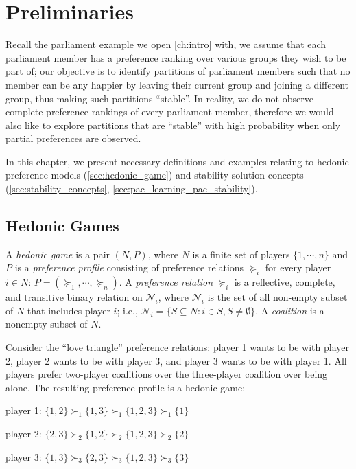 
\chapter{Preliminaries}
\label{ch:preliminaries}

Recall the parliament example we open \autoref{ch:intro} with, we assume that each
parliament member has a preference ranking over various groups they wish to be
part of; our objective is to identify partitions of parliament members such that
no member can be any happier by leaving their current group and joining a
different group, thus making such partitions ``stable''.
In reality, we do not observe complete preference rankings of every parliament
member, therefore we would also like to explore partitions that are ``stable''
with high probability when only partial preferences are observed.

In this chapter, we present necessary definitions and examples relating to
hedonic preference models (\autoref{sec:hedonic_game}) and
stability solution concepts (\autoref{sec:stability_concepts},
\autoref{sec:pac_learning_pac_stability}).

\section{Hedonic Games}
\label{sec:hedonic_game}

A \textit{hedonic game} is a pair $(N, P)$, where $N$ is a finite set of players
$\{1, \cdots, n\}$ and $P$ is a \textit{preference profile} consisting of
preference relations $\succeq_i$ for every player $i \in N$:
$P = (\succeq_1, \cdots, \succeq_n)$.
A \textit{preference relation} $\succeq_i$ is a reflective, complete, and
transitive binary relation on $\mathcal{N}_i$, where $\mathcal{N}_i$ is the set
of all non-empty subset of $N$ that includes player $i$;
i.e., $\mathcal{N}_i = \{S \subseteq N: i \in S, S \neq \emptyset \}$.
A \textit{coalition} is a nonempty subset of $N$.

\begin{example}
\label{example:not_top_responsive_pref}
  Consider the ``love triangle'' preference relations: player 1 wants
  to be with player 2, player 2 wants to be with player 3, and player 3 wants to
  be with player 1. All players prefer two-player coalitions over the three-player
  coalition over being alone.
  The resulting preference profile is a hedonic game:

  player 1: $\{1, 2\} \succ_1 \{1, 3\} \succ_1 \{1, 2, 3\} \succ_1  \{1\}$

  player 2: $\{2, 3\} \succ_2 \{1, 2\} \succ_2 \{1, 2, 3\} \succ_2  \{2\}$

  player 3: $\{1, 3\} \succ_3 \{2, 3\} \succ_3 \{1, 2, 3\} \succ_3  \{3\}$
\end{example}

